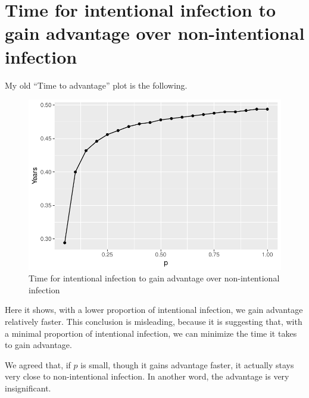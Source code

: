 \documentclass[12pt]{article}
\begin{document}
\section{Time for intentional infection to gain advantage over non-intentional infection}
My old ``Time to advantage'' plot is the following.
\begin{figure}[H]
  \caption{Time for intentional infection to gain advantage over non-intentional infection}
  \centering
  \includegraphics[width=1\textwidth]{Figures/Time_to_advantage_plot.pdf}
\end{figure}\label{advantage1}
Here it shows, with a lower proportion of intentional infection, we gain advantage relatively faster. This conclusion is misleading, because it is suggesting that, with a minimal proportion of intentional infection, we can minimize the time it takes to gain advantage.

We agreed that, if $p$ is small, though it gains advantage faster, it actually stays very close to non-intentional infection. In another word, the advantage is very insignificant.
\end{document}

